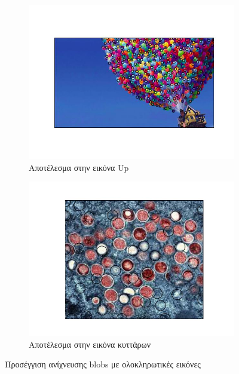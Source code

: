 \documentclass{article}
\newcommand{\eng}[1]{\foreignlanguage{english}{#1}}
\begin{document}
\begin{figure}[h]
    \centering
    \begin{subfigure}{\textwidth}
        \includegraphics[width=\textwidth]{../image-plots/blob-detection-ii-up.jpg}
        \caption{Αποτέλεσμα στην εικόνα \eng{Up}}
        \label{fig:up-ii}
    \end{subfigure}
    \begin{subfigure}{\textwidth}
        \includegraphics[width=\textwidth]{../image-plots/blob-detection-ii-cells.jpg}
        \caption{Αποτέλεσμα στην εικόνα κυττάρων}
        \label{fig:cells-ii}
    \end{subfigure}
    \caption{Προσέγγιση ανίχνευσης \eng{blobs} με ολοκληρωτικές εικόνες}
    \label{fig:ii}
\end{figure}
\FloatBarrier
\end{document}
